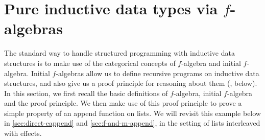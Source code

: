 
\section{Pure inductive data types via $f$-algebras}
\label{sec:f-algebras}


The standard way to handle structured programming with inductive data
structures is to make use of the categorical concepts of $f$-algebra
and initial $f$-algebra. Initial $f$-algebras allow us to define
recursive programs on inductive data structures, and also give us a
proof principle for reasoning about them
(, below). In this section, we first
recall the basic definitions of $f$-algebra, initial $f$-algebra and
the proof principle. We then make use of this proof principle to prove
a simple property of an append function on lists. We will revisit this
example below in \autoref{sec:direct-eappend} and
\autoref{sec:f-and-m-append}, in the setting of lists interleaved with
effects.

